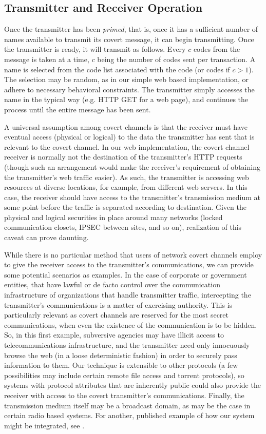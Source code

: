 \documentclass[10pt, conference]{IEEEtran}
\begin{document}
\subsection{Transmitter and Receiver Operation}
Once the transmitter has been {\em primed}, that is, once it has a sufficient number of names available to transmit its covert message, it can begin transmitting.  Once the transmitter is ready, it will transmit as follows.  Every $c$ codes from the message is taken at a time, $c$ being the number of codes sent per transaction.  A name is selected from the code list associated with the code (or codes if $c > 1$).  The selection may be random, as in our simple web based implementation, or adhere to necessary behavioral constraints.  The transmitter simply accesses the name in the typical way (e.g. HTTP GET for a web page), and continues the process until the entire message has been sent.

A universal assumption among covert channels is that the receiver must have eventual access (physical or logical) to the data the transmitter has sent that is relevant to the covert channel.  In our web implementation, the covert channel receiver is normally not the destination of the transmitter's HTTP requests (though such an arrangement would make the receiver's requirement of obtaining the transmitter's web traffic easier).  As such, the transmitter is accessing web resources at diverse locations, for example, from different web servers.  In this case, the receiver should have access to the transmitter's transmission medium at some point before the traffic is separated according to destination.  Given the physical and logical securities in place around many networks (locked communication closets, IPSEC between sites, and so on), realization of this caveat can prove daunting.

While there is no particular method that users of network covert channels employ to give the receiver access to the transmitter's communications, we can provide some potential scenarios as examples.  In the case of corporate or government entities, that have lawful or de facto control over the communication infrastructure of organizations that handle transmitter traffic, intercepting the transmitter's communications is a matter of exercising authority.  This is particularly relevant as covert channels are reserved for the most secret communications, when even the existence of the communication is to be hidden.  So, in this first example, subversive agencies may have illicit access to telecommunications infrastructure, and the transmitter need only innocuously browse the web (in a loose deterministic fashion) in order to securely pass information to them.  Our technique is extensible to other protocols (a few possibilities may include certain remote file access and torrent protocols), so systems with protocol attributes that are inherently public could also provide the receiver with access to the covert transmitter's communications.  Finally, the transmission medium itself may be a broadcast domain, as may be the case in certain radio based systems.  For another, published example of how our system might be integrated, see \cite{Girling87}.
\end{document}
